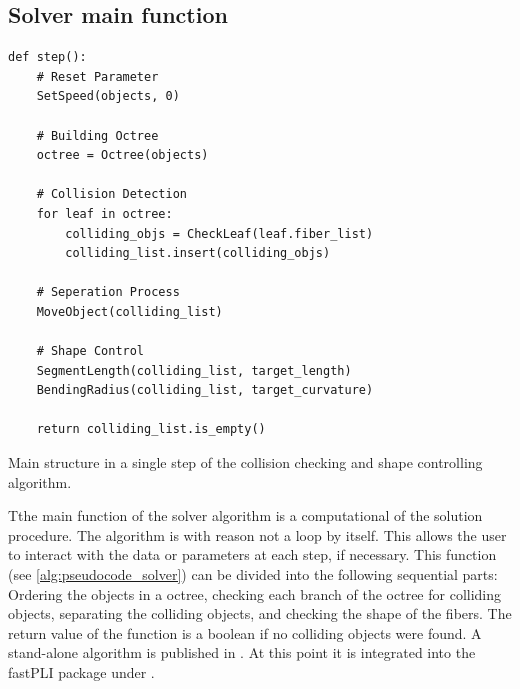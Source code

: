 \subsection{Solver main function}
%
\begin{lstfloat}[!tb]
\lstset{style=python}
\begin{lstlisting}[]
def step():
    # Reset Parameter
    SetSpeed(objects, 0)
   
    # Building Octree
    octree = Octree(objects)
   
    # Collision Detection
    for leaf in octree:
        colliding_objs = CheckLeaf(leaf.fiber_list)
        colliding_list.insert(colliding_objs)

    # Seperation Process
    MoveObject(colliding_list)

    # Shape Control
    SegmentLength(colliding_list, target_length)
    BendingRadius(colliding_list, target_curvature)

    return colliding_list.is_empty()
\end{lstlisting}
\caption{Main structure in a single step of the collision checking and shape controlling algorithm.}
\label{alg:pseudocode_solver}
\end{lstfloat}
%
Tthe main function of the solver algorithm is a computational  of the solution procedure.
The algorithm is with reason not a loop by itself.
This allows the user to interact with the data or parameters at each step, if necessary.
This  function (see \cref{alg:pseudocode_solver}) can be divided into the following sequential parts:
Ordering the objects in a octree, checking each branch of the octree for colliding objects, separating the colliding objects, and checking the shape of the fibers.
The return value of the function is a boolean if no colliding objects were found.
A stand-alone algorithm is published in \cite{Matuschke2019}.
At this point it is integrated into the \ac{fastPLI} package under .
%
%
%
